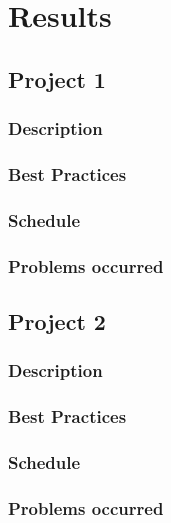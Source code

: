 
\chapter{Results} %

\label{Chapter4}

\section{Project 1}

\subsection{Description}

\subsection{Best Practices}

\subsection{Schedule}

\subsection{Problems occurred}

\section{Project 2}

\subsection{Description}

\subsection{Best Practices}

\subsection{Schedule}

\subsection{Problems occurred}

